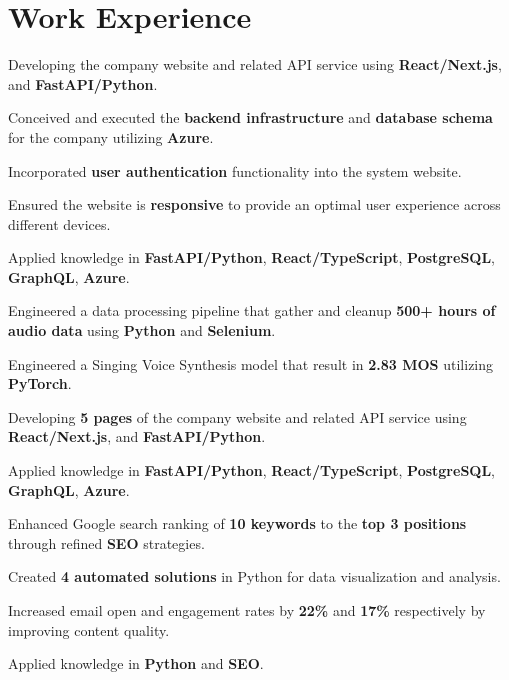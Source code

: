 \documentclass[a4paper,10pt]{article}
\begin{document}
\section{Work Experience}
\dvd{}
\begin{tightitemize}
  \item Developing the company website and related API service using \textbf{React/Next.js}, and \textbf{FastAPI/Python}.
  \item Conceived and executed the \textbf{backend infrastructure} and \textbf{database schema} for the company utilizing \textbf{Azure}.
  \item Incorporated \textbf{user authentication} functionality into the system website.
  \item Ensured the website is \textbf{responsive} to provide an optimal user experience across different devices.
  \item Applied knowledge in \textbf{FastAPI/Python}, \textbf{React/TypeScript}, \textbf{PostgreSQL}, \textbf{GraphQL}, \textbf{Azure}.
\end{tightitemize}

\dvd{}
\begin{tightitemize}
  \item Engineered a data processing pipeline that gather and cleanup \textbf{500+ hours of audio data} using \textbf{Python} and \textbf{Selenium}.
  \item Engineered a Singing Voice Synthesis model that result in \textbf{2.83 MOS} utilizing \textbf{PyTorch}.
  \item Developing \textbf{5 pages} of the company website and related API service using \textbf{React/Next.js}, and \textbf{FastAPI/Python}.
  \item Applied knowledge in \textbf{FastAPI/Python}, \textbf{React/TypeScript}, \textbf{PostgreSQL}, \textbf{GraphQL}, \textbf{Azure}.
\end{tightitemize}

\dvd{}

\begin{tightitemize}
  \item Enhanced Google search ranking of \textbf{10 keywords} to the \textbf{top 3 positions} through refined \textbf{SEO} strategies.
  \item Created \textbf{4 automated solutions} in Python for data visualization and analysis.
  \item Increased email open and engagement rates by \textbf{22\%} and \textbf{17\%} respectively by improving content quality.
  \item Applied knowledge in \textbf{Python} and \textbf{SEO}.
\end{tightitemize}
\end{document}
